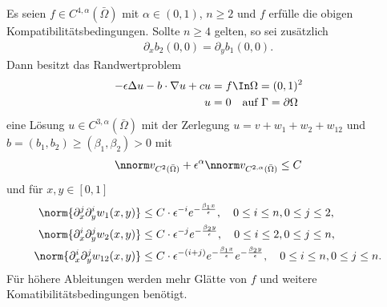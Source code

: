 \begin{satz}\label{thm:7-1}
  Es seien $f \in C^{4, \alpha}(\bar \Omega)$ mit $\alpha \in (0, 1)$, $n \geq 2$ und $f$ erfülle die obigen Kompatibilitätsbedingungen. Sollte $n \geq 4$ gelten, so sei zusätzlich
  \begin{align*}
    \partial_{x} b_{2}(0, 0) =    \partial_{y} b_{1}(0, 0). 
  \end{align*}
Dann besitzt das Randwertproblem
\begin{align*}
  - \epsilon \Delta u - b \cdot \nabla u + cu &= f \In \Omega = (0, 1)^{2}\\
  u &= 0 \quad \text{auf } \Gamma = \partial \Omega
\end{align*}
eine Lösung $u \in C^{3, \alpha}(\bar \Omega)$ mit der Zerlegung $u = v + w_{1} + w_{2} + w_{12}$ und $b = (b_{1}, b_{2}) \geq (\beta_{1}, \beta_{2}) > 0$ mit
\begin{align*}
  \nnorm v _{C^{2}(\bar \Omega)} + \epsilon^{\alpha} \nnorm v_{C^{2, \alpha}(\bar \Omega)} \leq C
\end{align*}
und für $x, y \in [0, 1]$
\begin{align*}
  \norm{\partial_{x}^{j} \partial_{y}^{i} w_{1}(x, y)} &\leq C \cdot \epsilon^{-i} e^{- \frac {\beta_{1} x}{\epsilon}}, \quad 0 \leq i \leq n, 0 \leq j\leq 2, \\
  \norm{\partial_{x}^{i} \partial_{y}^{j} w_{2}(x, y)} &\leq C \cdot \epsilon^{-j} e^{- \frac {\beta_{2} y}{\epsilon}}, \quad 0 \leq i \leq 2, 0 \leq j\leq n, \\
  \norm{\partial_{x}^{i} \partial_{y}^{j} w_{12}(x, y)} &\leq C \cdot \epsilon^{-(i+j)} e^{- \frac {\beta_{1} x}{\epsilon}}e^{- \frac {\beta_{2} y}{\epsilon}}, \quad 0 \leq i \leq n, 0 \leq j\leq n. 
\end{align*}
Für höhere Ableitungen werden mehr Glätte von $f$ und weitere Komatibilitätsbedingungen benötigt.
\end{satz}
